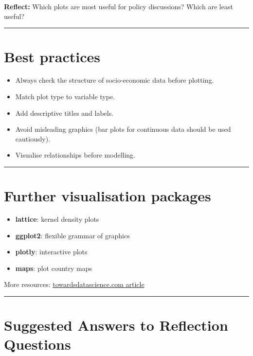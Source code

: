 \documentclass[
  letterpaper,
  DIV=11,
  numbers=noendperiod]{scrreprt}
\providecommand{\tightlist}{%
  \setlength{\itemsep}{0pt}\setlength{\parskip}{0pt}}
\begin{document}
\textbf{Reflect:} Which plots are most useful for policy discussions?
Which are least useful?

\begin{center}\rule{0.5\linewidth}{0.5pt}\end{center}

\section{Best practices}\label{best-practices-3}

\begin{itemize}
\tightlist
\item
  Always check the structure of socio-economic data before plotting.
\item
  Match plot type to variable type.
\item
  Add descriptive titles and labels.
\item
  Avoid misleading graphics (bar plots for continuous data should be
  used cautiously).
\item
  Visualise relationships before modelling.
\end{itemize}

\begin{center}\rule{0.5\linewidth}{0.5pt}\end{center}

\section{Further visualisation
packages}\label{further-visualisation-packages}

\begin{itemize}
\tightlist
\item
  \textbf{lattice}: kernel density plots
\item
  \textbf{ggplot2}: flexible grammar of graphics
\item
  \textbf{plotly}: interactive plots
\item
  \textbf{maps}: plot country maps
\end{itemize}

More resources:
\href{https://towardsdatascience.com/a-guide-to-data-visualisation-in-r-for-beginners-ef6d41a34174}{towardsdatascience.com
article}

\begin{center}\rule{0.5\linewidth}{0.5pt}\end{center}

\section{Suggested Answers to Reflection
Questions}\label{suggested-answers-to-reflection-questions-1}
\end{document}
